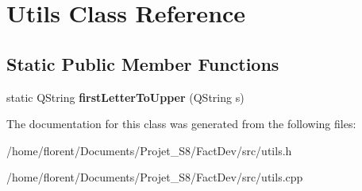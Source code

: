 \hypertarget{classUtils}{\section{Utils Class Reference}
\label{classUtils}
}
\subsection*{Static Public Member Functions}
\begin{DoxyCompactItemize}
\item 
\hypertarget{classUtils_a009b2a8ef00831aff87d2e46ca209398}{static Q\-String {\bfseries first\-Letter\-To\-Upper} (Q\-String s)}\label{classUtils_a009b2a8ef00831aff87d2e46ca209398}

\end{DoxyCompactItemize}


The documentation for this class was generated from the following files\-:\begin{DoxyCompactItemize}
\item 
/home/florent/\-Documents/\-Projet\-\_\-\-S8/\-Fact\-Dev/src/utils.\-h\item 
/home/florent/\-Documents/\-Projet\-\_\-\-S8/\-Fact\-Dev/src/utils.\-cpp\end{DoxyCompactItemize}

